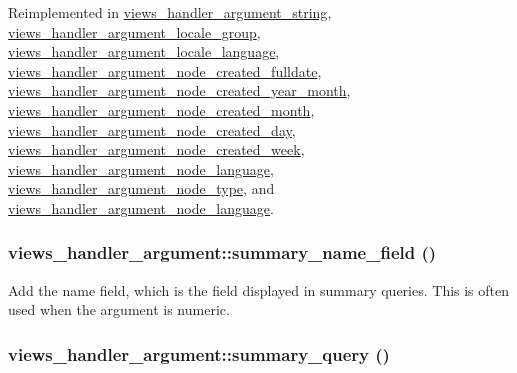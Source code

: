 Reimplemented in \hyperlink{classviews__handler__argument__string_8cc60c274ca743c78de23260edc3ee4a}{views\_\-handler\_\-argument\_\-string}, \hyperlink{classviews__handler__argument__locale__group_effcc011f90a9269f7793e089b994f71}{views\_\-handler\_\-argument\_\-locale\_\-group}, \hyperlink{classviews__handler__argument__locale__language_1677e5e59d9e98999bf5781d7de21b39}{views\_\-handler\_\-argument\_\-locale\_\-language}, \hyperlink{classviews__handler__argument__node__created__fulldate_b3d201e95c5307b166a85add6cfdebe2}{views\_\-handler\_\-argument\_\-node\_\-created\_\-fulldate}, \hyperlink{classviews__handler__argument__node__created__year__month_05689c48f520a9f0a1dc0008050eae03}{views\_\-handler\_\-argument\_\-node\_\-created\_\-year\_\-month}, \hyperlink{classviews__handler__argument__node__created__month_1376f79ca0408659bea06caa51ce6da6}{views\_\-handler\_\-argument\_\-node\_\-created\_\-month}, \hyperlink{classviews__handler__argument__node__created__day_cd7fa6e862306ba955d314d464e1cf2d}{views\_\-handler\_\-argument\_\-node\_\-created\_\-day}, \hyperlink{classviews__handler__argument__node__created__week_12d7be7da978ed5571bb28a17b6b2805}{views\_\-handler\_\-argument\_\-node\_\-created\_\-week}, \hyperlink{classviews__handler__argument__node__language_a07770dbbc40710c5369f76f4d4b6a35}{views\_\-handler\_\-argument\_\-node\_\-language}, \hyperlink{classviews__handler__argument__node__type_e4200f641b598c219f733f10386f7d90}{views\_\-handler\_\-argument\_\-node\_\-type}, and \hyperlink{classviews__handler__argument__node__language_a07770dbbc40710c5369f76f4d4b6a35}{views\_\-handler\_\-argument\_\-node\_\-language}.\hypertarget{classviews__handler__argument_6432caaadc9ed6e918ae8018bbb03ae2}{
\subsubsection[{summary\_\-name\_\-field}]{\setlength{\rightskip}{0pt plus 5cm}views\_\-handler\_\-argument::summary\_\-name\_\-field ()}}
\label{classviews__handler__argument_6432caaadc9ed6e918ae8018bbb03ae2}


Add the name field, which is the field displayed in summary queries. This is often used when the argument is numeric. \hypertarget{classviews__handler__argument_1dd6cc301b1c7c1c6829c59eb641a883}{
\subsubsection[{summary\_\-query}]{\setlength{\rightskip}{0pt plus 5cm}views\_\-handler\_\-argument::summary\_\-query ()}}
\label{classviews__handler__argument_1dd6cc301b1c7c1c6829c59eb641a883}


